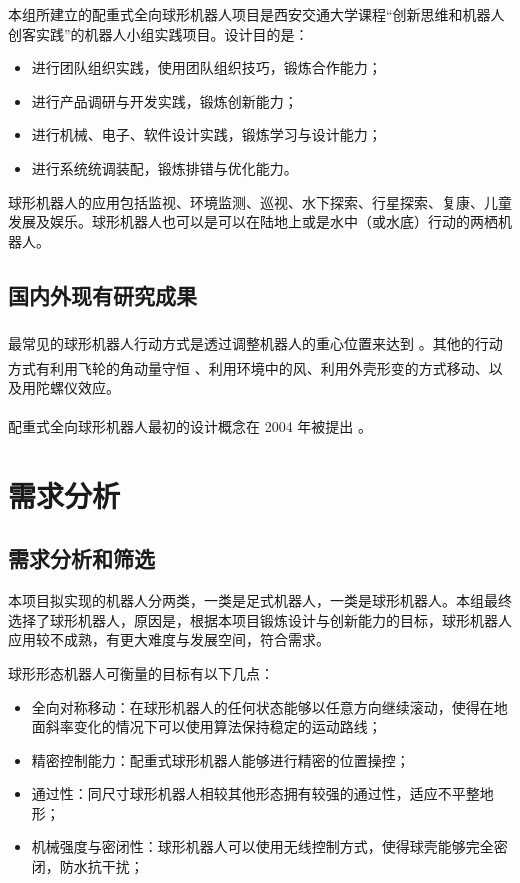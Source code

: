 \documentclass[a4paper]{ctexart}
\newcommand{ \upcite}[1]{\textsuperscript{\textsuperscript{\cite{#1} } }}
\numberwithin{equation}{section}
\numberwithin{table}{section}
\numberwithin{figure}{section}
\begin{document}
本组所建立的配重式全向球形机器人项目是西安交通大学课程“创新思维和机器人创客实践”的机器人小组实践项目。设计目的是：

\begin{itemize}
  \item 进行团队组织实践，使用团队组织技巧，锻炼合作能力；
  \item 进行产品调研与开发实践，锻炼创新能力；
  \item 进行机械、电子、软件设计实践，锻炼学习与设计能力；
  \item 进行系统统调装配，锻炼排错与优化能力。
\end{itemize}

球形机器人的应用包括监视、环境监测、巡视、水下探索、行星探索、复康、儿童发展及娱乐。球形机器人也可以是可以在陆地上或是水中（或水底）行动的两栖机器人。

\subsection{国内外现有研究成果}

最常见的球形机器人行动方式是透过调整机器人的重心位置来达到\upcite{halme1996motion}。其他的行动方式有利用飞轮的角动量守恒\upcite{joshi2010design}、利用环境中的风、利用外壳形变的方式移动、以及用陀螺仪效应。

配重式全向球形机器人最初的设计概念在 2004 年被提出\upcite{2004Introducing}。

\section{需求分析}

\subsection{需求分析和筛选}

本项目拟实现的机器人分两类，一类是足式机器人，一类是球形机器人。本组最终选择了球形机器人，原因是，根据本项目锻炼设计与创新能力的目标，球形机器人应用较不成熟，有更大难度与发展空间，符合需求。

球形形态机器人可衡量的目标有以下几点：

\begin{itemize}
  \item 全向对称移动：在球形机器人的任何状态能够以任意方向继续滚动，使得在地面斜率变化的情况下可以使用算法保持稳定的运动路线；
  \item 精密控制能力：配重式球形机器人能够进行精密的位置操控；
  \item 通过性：同尺寸球形机器人相较其他形态拥有较强的通过性，适应不平整地形；
  \item 机械强度与密闭性：球形机器人可以使用无线控制方式，使得球壳能够完全密闭，防水抗干扰；
\end{itemize}
\end{document}
